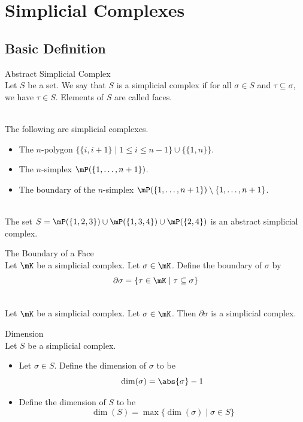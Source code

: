 \documentclass[a4paper]{article}
\begin{document}
\pagebreak
\section{Simplicial Complexes}
\subsection{Basic Definition}
\begin{defn}{Abstract Simplicial Complex}{}\\
Let $S$ be a set. We say that $S$ is a simplicial complex if for all $\sigma\in S$ and $\tau\subseteq\sigma$, we have $\tau\in S$. Elements of $S$ are called faces. 
\end{defn}

\begin{eg}{}{}\\
The following are simplicial complexes. 
\begin{itemize}
\item The $n$-polygon $\{\{i,i+1\}\;|\;1\leq i\leq n-1\}\cup\{\{1,n\}\}$. 
\item The $n$-simplex $\mP(\{1,\dots,n+1\})$. 
\item The boundary of the $n$-simplex $\mP(\{1,\dots,n+1\})\setminus\{1,\dots,n+1\}$. 
\end{itemize}
\end{eg}

\begin{eg}{}{}\\
The set $S=\mP(\{1,2,3\})\cup\mP(\{1,3,4\})\cup\mP(\{2,4\})$ is an abstract simplicial complex. 
\end{eg}

\begin{defn}{The Boundary of a Face}{}\\
Let $\mK$ be a simplicial complex. Let $\sigma\in\mK$. Define the boundary of $\sigma$ by $$\partial\sigma=\{\tau\in\mK\;|\;\tau\subseteq\sigma\}$$
\end{defn}

\begin{lmm}{}{}\\
Let $\mK$ be a simplicial complex. Let $\sigma\in\mK$. Then $\partial\sigma$ is a simplicial complex. 
\end{lmm}

\begin{defn}{Dimension}{}\\
Let $S$ be a simplicial complex. 
\begin{itemize}
\item Let $\sigma\in S$. Define the dimension of $\sigma$ to be $$\dim(\sigma)=\abs{\sigma}-1$$
\item Define the dimension of $S$ to be $$\dim(S)=\max\{\dim(\sigma)\;|\;\sigma\in S\}$$
\end{itemize}
\end{defn}
\end{document}
